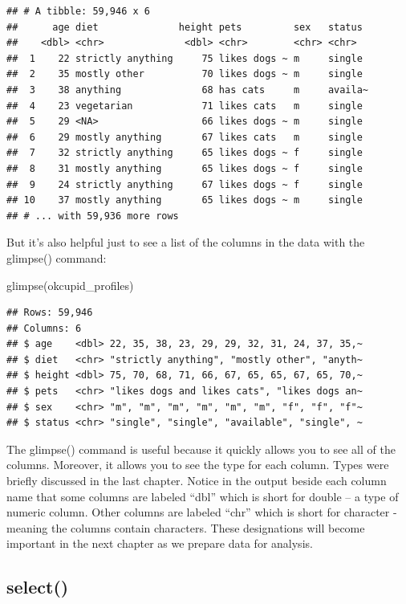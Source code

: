\documentclass[
]{krantz}
\makeatletter
\newenvironment{Shaded}{\begin{snugshade}}{\end{snugshade}}
\newcommand{\FunctionTok}[1]{\textcolor[rgb]{0,0,0}{#1}}
\newcommand{\NormalTok}[1]{#1}
\newenvironment{kframe}{%
\medskip{}
\setlength{\fboxsep}{.8em}
 \def\at@end@of@kframe{}%
 \ifinner\ifhmode%
  \def\at@end@of@kframe{\end{minipage}}%
  \begin{minipage}{\columnwidth}%
 \fi\fi%
 \def\FrameCommand##1{\hskip\@totalleftmargin \hskip-\fboxsep
 \colorbox{shadecolor}{##1}\hskip-\fboxsep
     \hskip-\linewidth \hskip-\@totalleftmargin \hskip\columnwidth}%
 \MakeFramed {\advance\hsize-\width
   \@totalleftmargin\z@ \linewidth\hsize
   \@setminipage}}%
 {\par\unskip\endMakeFramed%
 \at@end@of@kframe}
\renewenvironment{Shaded}{\begin{kframe}}{\end{kframe}}
\makeatother
\begin{document}
\begin{verbatim}
## # A tibble: 59,946 x 6
##      age diet              height pets         sex   status 
##    <dbl> <chr>              <dbl> <chr>        <chr> <chr>  
##  1    22 strictly anything     75 likes dogs ~ m     single 
##  2    35 mostly other          70 likes dogs ~ m     single 
##  3    38 anything              68 has cats     m     availa~
##  4    23 vegetarian            71 likes cats   m     single 
##  5    29 <NA>                  66 likes dogs ~ m     single 
##  6    29 mostly anything       67 likes cats   m     single 
##  7    32 strictly anything     65 likes dogs ~ f     single 
##  8    31 mostly anything       65 likes dogs ~ f     single 
##  9    24 strictly anything     67 likes dogs ~ f     single 
## 10    37 mostly anything       65 likes dogs ~ m     single 
## # ... with 59,936 more rows
\end{verbatim}

But it's also helpful just to see a list of the columns in the data with the glimpse() command:

\begin{Shaded}
\begin{Highlighting}[]
\FunctionTok{glimpse}\NormalTok{(okcupid\_profiles)}
\end{Highlighting}
\end{Shaded}

\begin{verbatim}
## Rows: 59,946
## Columns: 6
## $ age    <dbl> 22, 35, 38, 23, 29, 29, 32, 31, 24, 37, 35,~
## $ diet   <chr> "strictly anything", "mostly other", "anyth~
## $ height <dbl> 75, 70, 68, 71, 66, 67, 65, 65, 67, 65, 70,~
## $ pets   <chr> "likes dogs and likes cats", "likes dogs an~
## $ sex    <chr> "m", "m", "m", "m", "m", "m", "f", "f", "f"~
## $ status <chr> "single", "single", "available", "single", ~
\end{verbatim}

The glimpse() command is useful because it quickly allows you to see all of the columns. Moreover, it allows you to see the type for each column. Types were briefly discussed in the last chapter. Notice in the output beside each column name that some columns are labeled ``dbl'' which is short for double -- a type of numeric column. Other columns are labeled ``chr'' which is short for character - meaning the columns contain characters. These designations will become important in the next chapter as we prepare data for analysis.

\hypertarget{select}{%
\subsection{select()}\label{select}}
\end{document}
